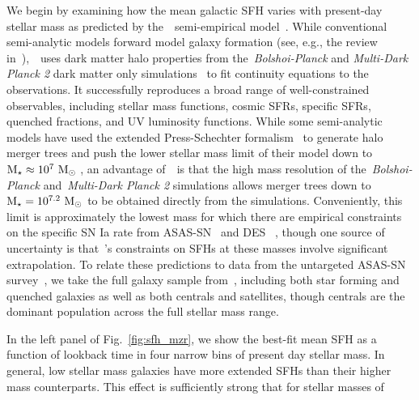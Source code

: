 \documentclass[foo.tex]{subfiles}
\begin{document}
We begin by examining how the mean galactic SFH varies with present-day stellar
mass as predicted by the~\um~semi-empirical model~\citep{Behroozi2019}.
{\color{red}
While conventional semi-analytic models forward model galaxy
formation (see, e.g., the review in~\citealt{Somerville2015a}),~\um~uses dark
matter halo properties from the~\textit{Bolshoi-Planck} and
\textit{Multi-Dark Planck 2} dark matter only simulations~\citep{Klypin2016}
to fit continuity equations to the observations.
It successfully reproduces a broad range of well-constrained observables,
including stellar mass functions, cosmic SFRs, specific SFRs, quenched
fractions, and UV luminosity functions.
}
While some semi-analytic models have used the extended Press-Schechter
formalism~\citep{Press1974, Bond1991} to generate halo merger trees and push
the lower stellar mass limit of their model down to~$\text{M}_\star \approx 10^7~\text{M}_\odot$
\citep[e.g.][]{Somerville2015b}, an advantage of~\um~is that the high mass
resolution of the~\textit{Bolshoi-Planck} and~\textit{Multi-Dark Planck 2}
simulations allows merger trees down to~$\text{M}_\star = 10^{7.2}~\text{M}_\odot$ to be
obtained directly from the simulations.
Conveniently, this limit is approximately the lowest mass for which there are
empirical constraints on the specific SN Ia rate from ASAS-SN~\citep{Brown2019}
and DES~\citep{Wiseman2021}%
{\color{red}%
, though one source of uncertainty is that~\um's constraints on SFHs at these
masses involve significant extrapolation.}
To relate these predictions to data from the untargeted ASAS-SN
survey~\citep{Shappee2014, Kochanek2017}, we take the full galaxy
sample from~\um, including both star forming and quenched galaxies as
well as both centrals and satellites, though centrals are the dominant
population across the full stellar mass range.
\par
In the left panel of Fig.~\ref{fig:sfh_mzr}, we show the best-fit mean SFH as a
function of lookback time in four narrow bins of present day stellar mass.
In general, low stellar mass galaxies have more extended SFHs than their
higher mass counterparts.
This effect is sufficiently strong that for stellar masses of
\end{document}

